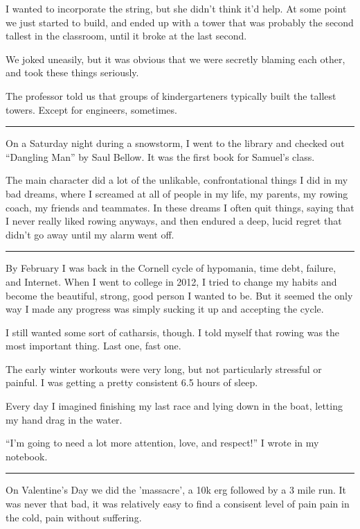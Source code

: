 I wanted to incorporate the string, but she didn't think it'd help.  At some
point we just started to build, and ended up with a tower that was probably the
second tallest in the classroom, until it broke at the last second.

We joked uneasily, but it was obvious that we were secretly blaming each other,
and took these things seriously.

The professor told us that groups of kindergarteners typically built the tallest
towers.  Except for engineers, sometimes.

\plainfancybreak{12pt}{2}{* * *}

On a Saturday night during a snowstorm, I went to the library and checked out
``Dangling Man'' by Saul Bellow.  It was the first book for Samuel's class.

The main character did a lot of the unlikable, confrontational things I did in
my bad dreams, where I screamed at all of people in my life, my parents, my
rowing coach, my friends and teammates.  In these dreams I often quit things,
saying that I never really liked rowing anyways, and then endured a deep, lucid
regret that didn't go away until my alarm went off.

\plainfancybreak{12pt}{2}{* * *}

By February I was back in the Cornell cycle of hypomania, time debt, failure,
and Internet.  When I went to college in 2012, I tried to change my habits and
become the beautiful, strong, good person I wanted to be.  But it seemed the
only way I made any progress was simply sucking it up and accepting the cycle.

I still wanted some sort of catharsis, though.  I told myself that rowing was
the most important thing.  Last one, fast one.  

The early winter workouts were very long, but not particularly stressful or
painful.  I was getting a pretty consistent 6.5 hours of sleep.

Every day I imagined finishing my last race and lying down in the boat, letting
my hand drag in the water.

``I'm going to need a lot more attention, love, and respect!'' I wrote in my
notebook. 

\plainfancybreak{12pt}{2}{* * *}

On Valentine's Day we did the 'massacre', a 10k erg followed by a 3 mile run.
It was never that bad, it was relatively easy to find a consisent level of pain
pain in the cold, pain without suffering. 

